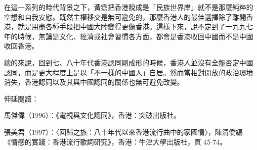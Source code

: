 在這一系列的時代背景之下，黃霑把香港說成是「民族世界岸」就不是那麼純粹的空想和自我安慰。既然主權移交是無可避免的，那麼香港人的最佳選擇除了離開香港，就是用盡各種手段把中國大陸變得更像香港。這樣下來，說不定到了一九九七年的時候，無論是文化、經濟或社會習慣各方面，都會是香港收回中國而不是中國收回香港。

總的來說，回到七、八十年代香港認同剛成形的時候，香港人並沒有全盤否定中國認同，而是更大程度上是以「不一樣的中國人」自居。然而當相對開放的政治環境消失，香港認同以及其與中國認同的關係也無可避免改變。


伸延閱讀：

馬傑偉（1996）：《電視與文化認同》，香港：突破出版社。

張美君（1997）：〈回歸之旅：八十年代以來香港流行曲中的家國情〉，陳清僑編《情感的實踐：香港流行歌詞研究》，香港：牛津大學出版社，頁 45-74。